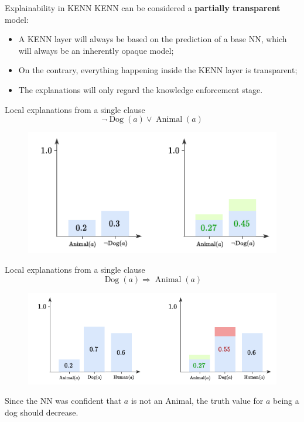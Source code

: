 \documentclass{beamer}
\begin{document}
\begin{frame}{Explainability in KENN}
KENN can be considered a \textbf{partially transparent} model:
\begin{itemize}
	\item A KENN layer will always be based on the prediction of a base NN, which will always be an inherently opaque model;
	\item On the contrary, everything happening inside the KENN layer is transparent;
	\item The explanations will only regard the knowledge enforcement stage.
\end{itemize}
\end{frame}


\begin{frame}{Local explanations from a single clause}
	$$\neg \operatorname{Dog}(a) \vee \operatorname{Animal}(a) $$ \pause
	\begin{figure}
		\includegraphics[width=0.9\linewidth]{images/explainability_example1.pdf}
	\end{figure}
\end{frame}

\begin{frame}{Local explanations from a single clause}
	$$\operatorname{Dog}(a) \Rightarrow \operatorname{Animal}(a)$$
	\begin{figure}
		\includegraphics[width=0.9\linewidth]{images/explainability_example2.pdf}
	\end{figure}
\pause
Since the NN was confident that $a$ is not an Animal, the truth value for $a$ being a dog should decrease.
\end{frame}
\end{document}
